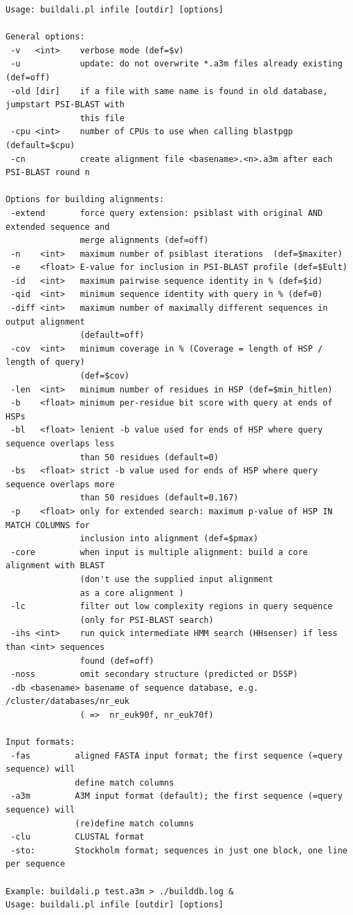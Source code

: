 \documentclass[11pt,a4paper]{article}
\begin{document}
\small \begin{verbatim}
Usage: buildali.pl infile [outdir] [options] 

General options:
 -v   <int>    verbose mode (def=$v)
 -u            update: do not overwrite *.a3m files already existing (def=off)
 -old [dir]    if a file with same name is found in old database, jumpstart PSI-BLAST with 
               this file
 -cpu <int>    number of CPUs to use when calling blastpgp (default=$cpu)
 -cn           create alignment file <basename>.<n>.a3m after each PSI-BLAST round n

Options for building alignments:
 -extend       force query extension: psiblast with original AND extended sequence and 
               merge alignments (def=off)
 -n    <int>   maximum number of psiblast iterations  (def=$maxiter)
 -e    <float> E-value for inclusion in PSI-BLAST profile (def=$Eult)
 -id   <int>   maximum pairwise sequence identity in % (def=$id)
 -qid  <int>   minimum sequence identity with query in % (def=0)
 -diff <int>   maximum number of maximally different sequences in output alignment 
               (default=off) 
 -cov  <int>   minimum coverage in % (Coverage = length of HSP / length of query) 
               (def=$cov)
 -len  <int>   minimum number of residues in HSP (def=$min_hitlen)
 -b    <float> minimum per-residue bit score with query at ends of HSPs
 -bl   <float> lenient -b value used for ends of HSP where query sequence overlaps less 
               than 50 residues (default=0)
 -bs   <float> strict -b value used for ends of HSP where query sequence overlaps more 
               than 50 residues (default=0.167)
 -p    <float> only for extended search: maximum p-value of HSP IN MATCH COLUMNS for 
               inclusion into alignment (def=$pmax)
 -core         when input is multiple alignment: build a core alignment with BLAST 
               (don't use the supplied input alignment
               as a core alignment )
 -lc           filter out low complexity regions in query sequence 
               (only for PSI-BLAST search)
 -ihs <int>    run quick intermediate HMM search (HHsenser) if less than <int> sequences 
               found (def=off)
 -noss         omit secondary structure (predicted or DSSP)
 -db <basename> basename of sequence database, e.g. /cluster/databases/nr_euk  
               ( =>  nr_euk90f, nr_euk70f)

Input formats:
 -fas         aligned FASTA input format; the first sequence (=query sequence) will 
              define match columns
 -a3m         A3M input format (default); the first sequence (=query sequence) will 
              (re)define match columns
 -clu         CLUSTAL format
 -sto:        Stockholm format; sequences in just one block, one line per sequence
  
Example: buildali.p test.a3m > ./builddb.log &
Usage: buildali.pl infile [outdir] [options] 
\end{verbatim} \normalsize
\end{document}
